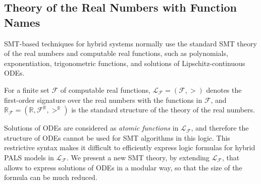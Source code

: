 %
%
%
%


\subsection{Theory of the Real Numbers with Function Names}

SMT-based techniques for hybrid systems
normally use the standard SMT theory of the real numbers and computable %
real functions,
such as polynomials, exponentiation, trigonometric functions,  
and solutions of Lipschitz-continuous ODEs.

\begin{definition}
For a finite set $\mathcal{F}$ of computable real functions,
%
$\mathcal{L}_\mathcal{F} = (\mathcal{F}, >)$ denotes the first-order signature over the real numbers
with the functions in $\mathcal{F}$,
and $\mathbb{R}_\mathcal{F} = (\mathbb{R}, \mathcal{F}^\mathbb{R}, >^\mathbb{R})$
is the standard structure of the theory of the real numbers.
\end{definition}


Solutions of ODEs are considered as \emph{atomic functions} in $\mathcal{L}_\mathcal{F}$,
and therefore the structure of ODEs cannot be used for SMT algorithms  in this logic.
This restrictive syntax makes it difficult to efficiently express logic formulas for hybrid PALS models 
in $\mathcal{L}_\mathcal{F}$. 
We present a new SMT theory,
by extending $\mathcal{L}_\mathcal{F}$, that allows to express solutions of ODEs in a modular way,
so that the size of the formula can be much reduced.


